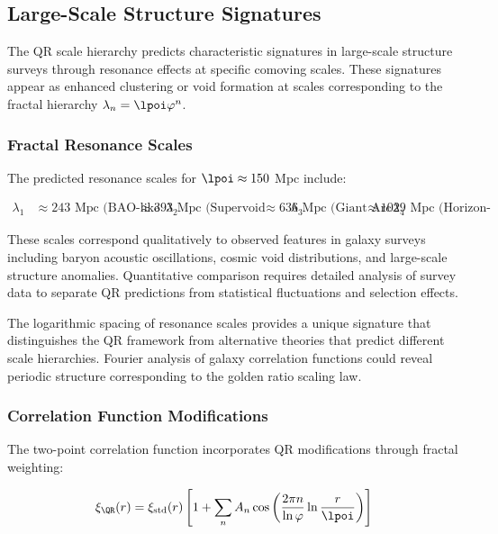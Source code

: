 \subsection{Large-Scale Structure Signatures}
\label{subsec:large-scale-structure}

The QR scale hierarchy predicts characteristic signatures in large-scale structure surveys through resonance effects at specific comoving scales. These signatures appear as enhanced clustering or void formation at scales corresponding to the fractal hierarchy $\lambda_n = \lpoi \varphi^n$.

\subsubsection{Fractal Resonance Scales}
\label{subsubsec:fractal-resonance}

The predicted resonance scales for $\lpoi \approx 150$ Mpc include:

\begin{align}
\lambda_1 &\approx 243 \text{ Mpc (BAO-like scale)} \
\lambda_2 &\approx 393 \text{ Mpc (Supervoid scale)} \
\lambda_3 &\approx 636 \text{ Mpc (Giant Arc scale)} \
\lambda_4 &\approx 1029 \text{ Mpc (Horizon-scale structures)}
\label{eq:resonance-scales}
\end{align}

These scales correspond qualitatively to observed features in galaxy surveys including baryon acoustic oscillations, cosmic void distributions, and large-scale structure anomalies. Quantitative comparison requires detailed analysis of survey data to separate QR predictions from statistical fluctuations and selection effects.

The logarithmic spacing of resonance scales provides a unique signature that distinguishes the QR framework from alternative theories that predict different scale hierarchies. Fourier analysis of galaxy correlation functions could reveal periodic structure corresponding to the golden ratio scaling law.

\subsubsection{Correlation Function Modifications}
\label{subsubsec:correlation-modifications}

The two-point correlation function incorporates QR modifications through fractal weighting:

\begin{equation}
\xi_{\QR}(r) = \xi_{\text{std}}(r) \left[1 + \sum_n A_n \cos\left(\frac{2\pi n}{\ln \varphi} \ln \frac{r}{\lpoi}\right)\right]
\label{eq:correlation-function-qr}
\end{equation}

